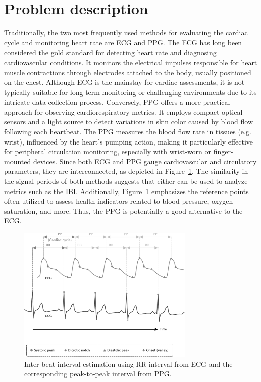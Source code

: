 \section{Problem description}
\label{sec:problem}

Traditionally, the two most frequently used methods for evaluating the cardiac cycle and monitoring heart rate are \acrlong{ECG} and \acrlong{PPG}. The \gls{ECG} has long been considered the gold standard for detecting heart rate and diagnosing cardiovascular conditions. It monitors the electrical impulses responsible for heart muscle contractions through electrodes attached to the body, usually positioned on the chest. Although \gls{ECG} is the mainstay for cardiac assessments, it is not typically suitable for long-term monitoring or challenging environments due to its intricate data collection process. Conversely, \gls{PPG} offers a more practical approach for observing cardiorespiratory metrics. It employs compact optical sensors and a light source to detect variations in skin color caused by blood flow following each heartbeat. The \gls{PPG} measures the blood flow rate in tissues (e.g. wrist), influenced by the heart's pumping action, making it particularly effective for peripheral circulation monitoring, especially with wrist-worn or finger-mounted devices. Since both \gls{ECG} and \gls{PPG} gauge cardiovascular and circulatory parameters, they are interconnected, as depicted in Figure~\ref{fig:ecg_and_ppg}. The similarity in the signal periods of both methods suggests that either can be used to analyze metrics such as the \gls{IBI}. Additionally, Figure~\ref{fig:ecg_and_ppg} emphasizes the reference points often utilized to assess health indicators related to blood pressure, oxygen saturation, and more. Thus, the \gls{PPG} is potentially a good alternative to the \gls{ECG}.

\begin{figure}[]
    \centering
    \includegraphics[width=0.75\textwidth]{img/ecg_ppg_signals.pdf}
    \caption{Inter-beat interval estimation using RR interval from \acrlong{ECG} and the corresponding peak-to-peak interval from \acrlong{PPG}.}
    \label{fig:ecg_and_ppg}
\end{figure}

